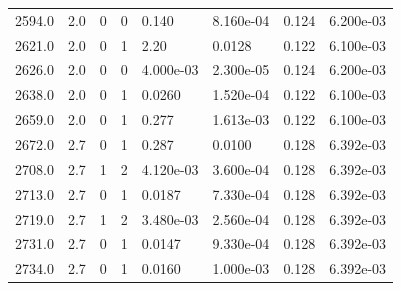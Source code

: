 \documentclass[preview]{standalone}
\begin{document}
{{{\begin{tabular}{L{1.2cm}C{1.2cm} C{0.3cm}C{0.5cm} C{1.4cm}C{1.4cm} C{1.4cm}C{1.4cm}}
  2594.0  &   2.0  & 0     &  0 &  0.140  & 8.160e-04  & 0.124 &  6.200e-03   \\ 
  2621.0  &   2.0  & 0     &  1 &  2.20  & 0.0128  & 0.122 &  6.100e-03   \\ 
  2626.0  &   2.0  & 0     &  0 &  4.000e-03  & 2.300e-05  & 0.124 &  6.200e-03   \\ 
  2638.0  &   2.0  & 0     &  1 &  0.0260  & 1.520e-04  & 0.122 &  6.100e-03   \\ 
  2659.0  &   2.0  & 0     &  1 &  0.277  & 1.613e-03  & 0.122 &  6.100e-03   \\ 
  2672.0  &   2.7  & 0     &  1 &  0.287  & 0.0100  & 0.128 &  6.392e-03   \\ 
  2708.0  &   2.7  & 1     &  2 &  4.120e-03  & 3.600e-04  & 0.128 &  6.392e-03   \\ 
  2713.0  &   2.7  & 0     &  1 &  0.0187  & 7.330e-04  & 0.128 &  6.392e-03   \\ 
  2719.0  &   2.7  & 1     &  2 &  3.480e-03  & 2.560e-04  & 0.128 &  6.392e-03   \\ 
  2731.0  &   2.7  & 0     &  1 &  0.0147  & 9.330e-04  & 0.128 &  6.392e-03   \\ 
  2734.0  &   2.7  & 0     &  1 &  0.0160  & 1.000e-03  & 0.128 &  6.392e-03   \\ 
\hline 
\end{tabular} 

}}}
\end{document}
